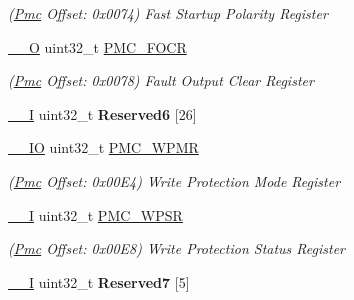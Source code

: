 \begin{DoxyCompactItemize}
\begin{DoxyCompactList}\small\item\em (\mbox{\hyperlink{structPmc}{Pmc}} Offset\+: 0x0074) Fast Startup Polarity Register \end{DoxyCompactList}\item 
\mbox{\label{structPmc_af346765f0476d42471d756ea2e54fe14}} 
\mbox{\hyperlink{core__cm7_8h_a7e25d9380f9ef903923964322e71f2f6}{\+\_\+\+\_\+O}} uint32\+\_\+t \mbox{\hyperlink{structPmc_af346765f0476d42471d756ea2e54fe14}{P\+M\+C\+\_\+\+F\+O\+CR}}
\begin{DoxyCompactList}\small\item\em (\mbox{\hyperlink{structPmc}{Pmc}} Offset\+: 0x0078) Fault Output Clear Register \end{DoxyCompactList}\item 
\mbox{\label{structPmc_aaccb7f88b0f6cd0652db6275274a1438}} 
\mbox{\hyperlink{core__cm7_8h_af63697ed9952cc71e1225efe205f6cd3}{\+\_\+\+\_\+I}} uint32\+\_\+t {\bfseries Reserved6} \mbox{[}26\mbox{]}
\item 
\mbox{\label{structPmc_ac5f5fe031ba5032fdc169fe39480e886}} 
\mbox{\hyperlink{core__cm7_8h_aec43007d9998a0a0e01faede4133d6be}{\+\_\+\+\_\+\+IO}} uint32\+\_\+t \mbox{\hyperlink{structPmc_ac5f5fe031ba5032fdc169fe39480e886}{P\+M\+C\+\_\+\+W\+P\+MR}}
\begin{DoxyCompactList}\small\item\em (\mbox{\hyperlink{structPmc}{Pmc}} Offset\+: 0x00\+E4) Write Protection Mode Register \end{DoxyCompactList}\item 
\mbox{\label{structPmc_a663df6bf677bfb19a7f7b12b3f805dcf}} 
\mbox{\hyperlink{core__cm7_8h_af63697ed9952cc71e1225efe205f6cd3}{\+\_\+\+\_\+I}} uint32\+\_\+t \mbox{\hyperlink{structPmc_a663df6bf677bfb19a7f7b12b3f805dcf}{P\+M\+C\+\_\+\+W\+P\+SR}}
\begin{DoxyCompactList}\small\item\em (\mbox{\hyperlink{structPmc}{Pmc}} Offset\+: 0x00\+E8) Write Protection Status Register \end{DoxyCompactList}\item 
\mbox{\label{structPmc_ad8f6162873759eb3485f319a03277801}} 
\mbox{\hyperlink{core__cm7_8h_af63697ed9952cc71e1225efe205f6cd3}{\+\_\+\+\_\+I}} uint32\+\_\+t {\bfseries Reserved7} \mbox{[}5\mbox{]}

\end{DoxyCompactItemize}
